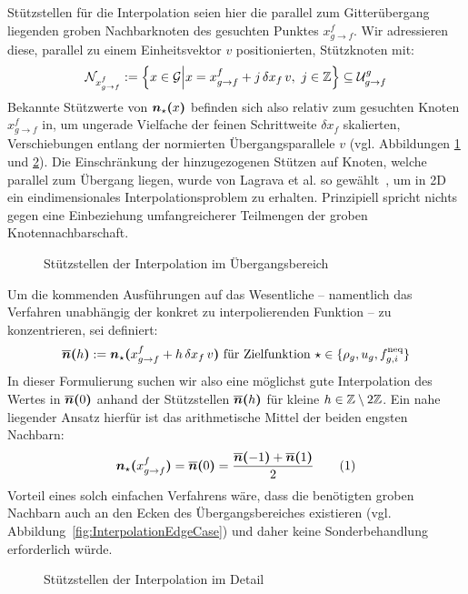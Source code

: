 \bigskip

Stützstellen für die Interpolation seien hier die parallel zum Gitterübergang liegenden groben Nachbarknoten des gesuchten Punktes \(x_{g \to f}^f\). Wir adressieren diese, parallel zu einem Einheitsvektor \(v\) positionierten, Stützknoten mit:
\[\mathcal{N}_{x_{g \to f}^f} := \left\{x \in \mathcal{G} \middle| x = x_{g \to f}^f + j \, \delta x_f \, v,\ j \in \mathbb{Z} \right\} \subseteq \mathcal{U}_{g \to f}^g\]
Bekannte Stützwerte von \(\boldsymbol{n}_{\star}\boldsymbol{(}{x}\boldsymbol{)}\) befinden sich also relativ zum gesuchten Knoten \(x_{g \to f}^f\) in, um ungerade Vielfache der feinen Schrittweite \(\delta x_f\) skalierten, Verschiebungen entlang der normierten Übergangsparallele \(v\) (vgl. Abbildungen \ref{fig:InterpolationBasis} und \ref{fig:InterpolationDetail}). Die Einschränkung der hinzugezogenen Stützen auf Knoten, welche parallel zum Übergang liegen, wurde von Lagrava et al. so gewählt~\cite[Kap.~3.6]{Lagrava12}, um in 2D ein eindimensionales Interpolationsproblem zu erhalten. Prinzipiell spricht nichts gegen eine Einbeziehung umfangreicherer Teilmengen der groben Knotennachbarschaft.

\begin{figure}[h]
\centering

\caption{Stützstellen der Interpolation im Übergangsbereich}
\label{fig:InterpolationBasis}
\end{figure}

Um die kommenden Ausführungen auf das Wesentliche -- namentlich das Verfahren unabhängig der konkret zu interpolierenden Funktion -- zu konzentrieren, sei definiert:
\[\overline{\boldsymbol{n}}\boldsymbol{(}{h}\boldsymbol{)} := \boldsymbol{n}_{\star}\boldsymbol{(}{x_{g \to f}^f + h \, \delta x_f \, v}\boldsymbol{)} \text{ für Zielfunktion } \star \in \{\rho_g, u_g, f_{g,i}^\text{neq}\}\]
In dieser Formulierung suchen wir also eine möglichst gute Interpolation des Wertes in \(\overline{\boldsymbol{n}}\boldsymbol{(}{0}\boldsymbol{)}\) anhand der Stützstellen \(\overline{\boldsymbol{n}}\boldsymbol{(}{h}\boldsymbol{)}\) für kleine \(h \in \mathbb{Z} \setminus 2\mathbb{Z}\). Ein nahe liegender Ansatz hierfür ist das arithmetische Mittel der beiden engsten Nachbarn:
\[\ipolarg{\star}{x_{g \to f}^f} = \sipolarg{0} = \frac{\sipolarg{-1} + \sipolarg{1}}{2} \numberthis\label{eq:ipol2ord}\]
Vorteil eines solch einfachen Verfahrens wäre, dass die benötigten groben Nachbarn auch an den Ecken des Übergangsbereiches existieren (vgl. Abbildung~\ref{fig:InterpolationEdgeCase}) und daher keine Sonderbehandlung erforderlich würde.
\begin{figure}[h]
\centering

\caption{Stützstellen der Interpolation im Detail}
\label{fig:InterpolationDetail}
\end{figure}

